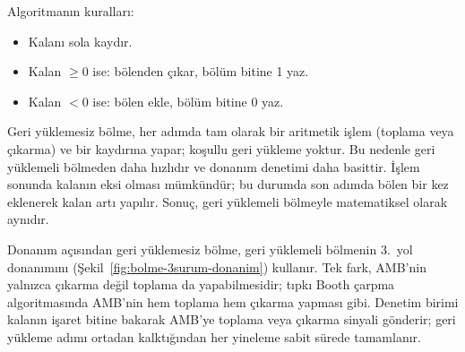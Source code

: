 Algoritmanın kuralları:
\begin{itemize}[nosep]
    \item Kalanı sola kaydır.
    \item Kalan $\geq 0$ ise: bölenden çıkar, bölüm bitine 1 yaz.
    \item Kalan $< 0$ ise: bölen ekle, bölüm bitine 0 yaz.
\end{itemize}

Geri yüklemesiz bölme, her adımda tam olarak bir aritmetik işlem (toplama veya çıkarma) ve bir kaydırma yapar; koşullu geri yükleme yoktur. Bu nedenle geri yüklemeli bölmeden daha hızlıdır ve donanım denetimi daha basittir. İşlem sonunda kalanın eksi olması mümkündür; bu durumda son adımda bölen bir kez eklenerek kalan artı yapılır. Sonuç, geri yüklemeli bölmeyle matematiksel olarak aynıdır.

Donanım açısından geri yüklemesiz bölme, geri yüklemeli bölmenin 3.\ yol donanımını (Şekil~\ref{fig:bolme-3surum-donanim}) kullanır. Tek fark, AMB'nin yalnızca çıkarma değil toplama da yapabilmesidir; tıpkı Booth çarpma algoritmasında AMB'nin hem toplama hem çıkarma yapması gibi. Denetim birimi kalanın işaret bitine bakarak AMB'ye toplama veya çıkarma sinyali gönderir; geri yükleme adımı ortadan kalktığından her yineleme sabit sürede tamamlanır.

